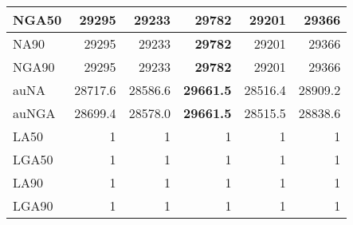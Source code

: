 \documentclass[12pt,a4paper]{article}
\begin{document}
\begin{table}[ht]
\begin{center}
\begin{tabular}{|l*{5}{|r}|}
NGA50 & 29295 & 29233 & {\bf 29782} & 29201 & 29366 \\ \hline
NA90 & 29295 & 29233 & {\bf 29782} & 29201 & 29366 \\ \hline
NGA90 & 29295 & 29233 & {\bf 29782} & 29201 & 29366 \\ \hline
auNA & 28717.6 & 28586.6 & {\bf 29661.5} & 28516.4 & 28909.2 \\ \hline
auNGA & 28699.4 & 28578.0 & {\bf 29661.5} & 28515.5 & 28838.6 \\ \hline
LA50 & 1 & 1 & 1 & 1 & 1 \\ \hline
LGA50 & 1 & 1 & 1 & 1 & 1 \\ \hline
LA90 & 1 & 1 & 1 & 1 & 1 \\ \hline
LGA90 & 1 & 1 & 1 & 1 & 1 \\ \hline
\end{tabular}
\end{center}
\end{table}
\end{document}
